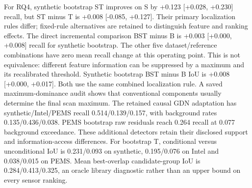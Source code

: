 For RQ4, synthetic bootstrap ST improves on S by
+0.123 [+0.028, +0.230] recall, but ST minus T is
+0.008 [-0.085, +0.127]. Their primary localization rules differ;
fixed-rule alternatives are retained to distinguish feature and ranking effects.
The direct incremental comparison BST minus B is
+0.003 [+0.000, +0.008] recall for synthetic bootstrap.
The other five dataset/reference combinations have zero mean recall change at
this operating point. This is not equivalence: different feature information
can be suppressed by a maximum and its recalibrated threshold.
Synthetic bootstrap BST minus B IoU is +0.008 [+0.000, +0.017].
Both use the same combined localization rule. A saved maximum-dominance audit
shows that conventional components usually determine the final scan maximum.
The retained causal GDN adaptation has synthetic/Intel/PEMS recall
0.514/0.139/0.157, with background rates
0.135/0.436/0.038.
PEMS bootstrap raw residuals reach 0.264 recall at
0.077 background exceedance. These additional
detectors retain their disclosed support and information-access differences.
For bootstrap T, conditional versus unconditional IoU is
0.231/0.093 on synthetic,
0.195/0.076 on Intel and
0.038/0.015 on PEMS.
Mean best-overlap candidate-group IoU is
0.284/0.413/0.325,
an oracle library diagnostic rather than an upper bound on every sensor ranking.
